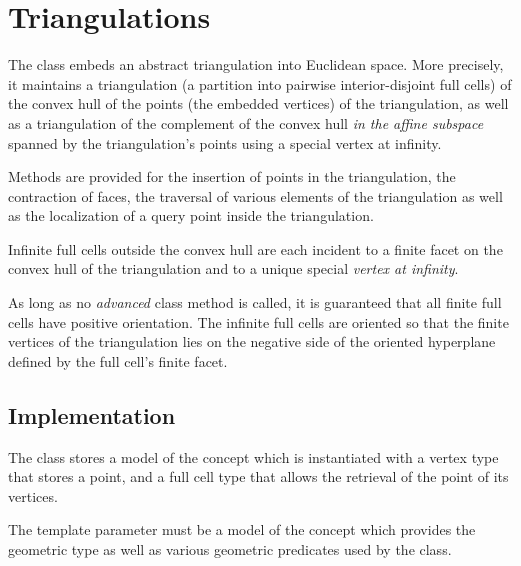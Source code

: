 \section{Triangulations}

The class  embeds an abstract 
triangulation into Euclidean space. More precisely, it
maintains a triangulation (a partition into pairwise interior-disjoint
full cells) of the convex hull of the points (the embedded vertices) of the
triangulation, as well as a triangulation of the complement of the convex hull
{\em in the affine subspace} spanned by the triangulation's points
using a special vertex at infinity.

Methods are provided for the insertion of points in the triangulation, the
contraction of faces, the traversal of various elements of the triangulation
as well as the localization of a query point inside the triangulation.

Infinite full cells outside the convex hull are each incident to
a finite facet on the convex hull of the triangulation and to a unique special
{\em vertex at infinity}. 

As long as no \emph{advanced} class method is called, it is guaranteed that
all finite full cells have positive orientation. The infinite full cells are
oriented so that the finite vertices of the triangulation lies on the negative side of
the oriented hyperplane defined by the full cell's finite facet.



\subsection{Implementation}

The class  stores a model \tds
of the concept  which is instantiated with a
vertex type that stores a point, and a full cell type that allows the retrieval
of the point of its vertices.

The template parameter  must be a model of the concept
 which provides the geometric  type as well
as various geometric predicates used by the  class.

